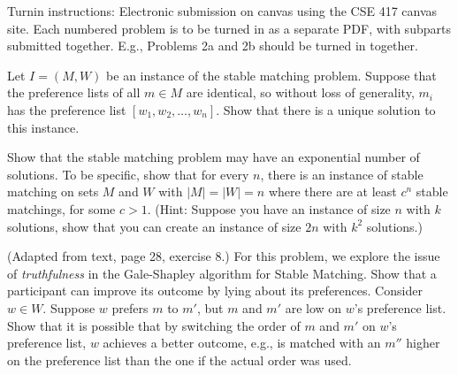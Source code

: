 

\bigskip
{}
\bigskip

\bigskip

Turnin instructions:  Electronic submission on canvas using the CSE 417 canvas site.   Each numbered problem is to be turned in as a separate PDF, with subparts submitted together.  E.g., Problems 2a and 2b should be turned in together.


  Let $I=(M,W)$ be an instance of the stable matching problem.  Suppose that the preference lists of all $m\in M$ are identical, so without loss of generality,  $m_i$ has the preference list $[w_1, w_2, \ldots, w_n]$.  Show that there is a unique solution to this instance.



 Show that the stable matching problem may have an exponential number of solutions.  To be specific, show that for every $n$, there is an instance of stable matching on sets $M$ and $W$ with $| M | = |W| = n$ where there are at least $c^n$ stable matchings, for some $c>1$.  (Hint: Suppose you have an instance of size $n$ with $k$ solutions,  show that you can create an instance of size $2n$ with $k^2$ solutions.)

 (Adapted from text, page 28, exercise 8.)  For this problem, we explore the issue of {\it truthfulness} in the Gale-Shapley algorithm for Stable Matching.  Show that a participant can improve its outcome by lying about its preferences.
Consider $w\in W$.  Suppose $w$ prefers $m$ to $m'$, but $m$ and $m'$ are low on $w$'s preference list. Show that it is possible that by switching the order of $m$ and $m'$ on $w$'s preference list, $w$ achieves a better outcome, e.g., is matched with an $m''$ higher on the preference list than the one if the actual order was used.


